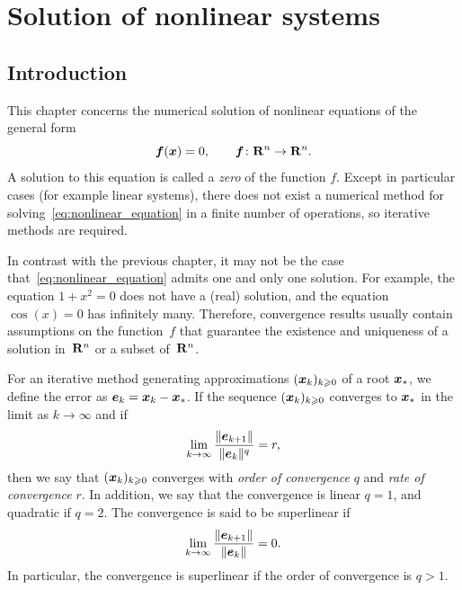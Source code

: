\chapter{Solution of nonlinear systems}
\label{cha:solution_of_nonlinear_systems}
\minitoc

\section*{Introduction}

This chapter concerns the numerical solution of nonlinear equations of the general form
\begin{equation}
    \label{eq:nonlinear_equation}
    \mathbf{\boldsymbol{f}}(\mathbf{\boldsymbol{x}}) = 0, \qquad \mathbf{\boldsymbol{f}}\colon \mathbf R^n \to \mathbf R^n.
\end{equation}
A solution to this equation is called a \emph{zero} of the function $f$.
Except in particular cases (for example linear systems),
there does not exist a numerical method for solving~\eqref{eq:nonlinear_equation} in a finite number of operations,
so iterative methods are required.

In contrast with the previous chapter,
it may not be the case that~\eqref{eq:nonlinear_equation} admits one and only one solution.
For example, the equation $1 + x^2 = 0$ does not have a (real) solution,
and the equation $\cos(x) = 0$ has infinitely many.
Therefore, convergence results usually contain assumptions on the function~$f$ that guarantee the existence and uniqueness of a solution in~$\mathbf R^n$ or a subset of~$\mathbf R^n$.

For an iterative method generating approximations $(\mathbf{\boldsymbol{x}}_k)_{k \geqslant 0}$ of a root $\mathbf{\boldsymbol{x}}_*$,
we define the error as $\mathbf{\boldsymbol{e}}_k = \mathbf{\boldsymbol{x}}_k - \mathbf{\boldsymbol{x}}_*$.
If the sequence $(\mathbf{\boldsymbol{x}}_k)_{k \geqslant 0}$ converges to $\mathbf{\boldsymbol{x}}_*$ in the limit as $k \to \infty$
and if
\begin{equation}
    \label{eq:rate_of_convergence}
    \lim_{k \to \infty} \frac{\lVert\mathbf{\boldsymbol{e}}_{k+1}\rVert}{\lVert\mathbf{\boldsymbol{e}}_k\rVert^q} = r,
\end{equation}
then we say that $(\mathbf{\boldsymbol{x}}_k)_{k \geqslant 0}$ converges with \emph{order of convergence} $q$ and
\emph{rate of convergence} $r$.
In addition, we say that the convergence is linear $q = 1$,
and quadratic if $q = 2$.
The convergence is said to be superlinear if
\begin{equation}
    \label{eq:superlinear}
    \lim_{k \to \infty} \frac{\lVert\mathbf{\boldsymbol{e}}_{k+1}\rVert}{\lVert\mathbf{\boldsymbol{e}}_k\rVert} = 0.
\end{equation}
In particular,
the convergence is superlinear if the order of convergence is $q > 1$.

